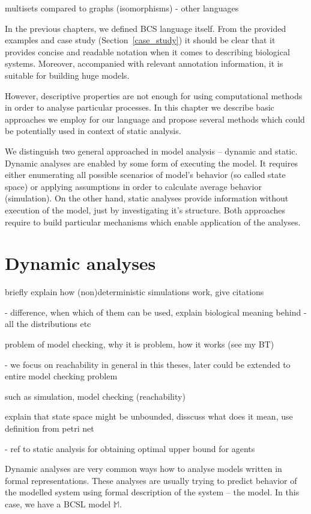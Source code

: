\documentclass[12pt]{fithesis2}
\begin{document}
multisets compared to graphs (isomorphisms) - other languages

In the previous chapters, we defined BCS language itself. From the provided examples and case study (Section~\ref{case_study}) it should be clear that it provides concise and readable notation when it comes to describing biological systems. Moreover, accompanied with relevant annotation information, it is suitable for building huge models.

However, descriptive properties are not enough for using computational methods in order to analyse particular processes. In this chapter we describe basic approaches we employ for our language and propose several methods which could be potentially used in context of static analysis.

We distinguish two general approached in model analysis -- dynamic and static. Dynamic analyses are enabled by some form of executing the model. It requires either enumerating all possible scenarios of model's behavior (so called state space) or applying assumptions in order to calculate average behavior (simulation). On the other hand, static analyses provide information without execution of the model, just by investigating it's structure. Both approaches require to build particular mechanisms which enable application of the analyses.

\section{Dynamic analyses}

briefly explain how (non)deterministic simulations work, give citations

 - difference, when which of them can be used, explain biological meaning behind
 - all the distributions etc

problem of model checking, why it is problem, how it works (see my BT) 

 - we focus on reachability in general in this theses, later could be extended to entire model checking problem

such as simulation, model checking (reachability)

explain that state space might be unbounded, disscuss what does it mean, use definition from petri net

 - ref to static analysis for obtaining optimal upper bound for agents

Dynamic analyses are very common ways how to analyse models written in formal representations. These analyses are usually trying to predict behavior of the modelled system using formal description of the system -- the model. In this case, we have a BCSL model $\mathds{M}$. 
\end{document}
